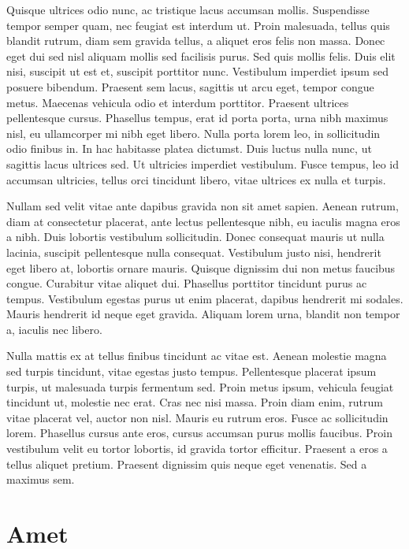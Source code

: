 Quisque ultrices odio nunc, ac tristique lacus accumsan mollis. Suspendisse tempor semper quam, nec feugiat est interdum ut. Proin malesuada, tellus quis blandit rutrum, diam sem gravida tellus, a aliquet eros felis non massa. Donec eget dui sed nisl aliquam mollis sed facilisis purus. Sed quis mollis felis. Duis elit nisi, suscipit ut est et, suscipit porttitor nunc. Vestibulum imperdiet ipsum sed posuere bibendum. Praesent sem lacus, sagittis ut arcu eget, tempor congue metus. Maecenas vehicula odio et interdum porttitor. Praesent ultrices pellentesque cursus. Phasellus tempus, erat id porta porta, urna nibh maximus nisl, eu ullamcorper mi nibh eget libero. Nulla porta lorem leo, in sollicitudin odio finibus in. In hac habitasse platea dictumst. Duis luctus nulla nunc, ut sagittis lacus ultrices sed. Ut ultricies imperdiet vestibulum. Fusce tempus, leo id accumsan ultricies, tellus orci tincidunt libero, vitae ultrices ex nulla et turpis.

Nullam sed velit vitae ante dapibus gravida non sit amet sapien. Aenean rutrum, diam at consectetur placerat, ante lectus pellentesque nibh, eu iaculis magna eros a nibh. Duis lobortis vestibulum sollicitudin. Donec consequat mauris ut nulla lacinia, suscipit pellentesque nulla consequat. Vestibulum justo nisi, hendrerit eget libero at, lobortis ornare mauris. Quisque dignissim dui non metus faucibus congue. Curabitur vitae aliquet dui. Phasellus porttitor tincidunt purus ac tempus. Vestibulum egestas purus ut enim placerat, dapibus hendrerit mi sodales. Mauris hendrerit id neque eget gravida. Aliquam lorem urna, blandit non tempor a, iaculis nec libero.

Nulla mattis ex at tellus finibus tincidunt ac vitae est. Aenean molestie magna sed turpis tincidunt, vitae egestas justo tempus. Pellentesque placerat ipsum turpis, ut malesuada turpis fermentum sed. Proin metus ipsum, vehicula feugiat tincidunt ut, molestie nec erat. Cras nec nisi massa. Proin diam enim, rutrum vitae placerat vel, auctor non nisl. Mauris eu rutrum eros. Fusce ac sollicitudin lorem. Phasellus cursus ante eros, cursus accumsan purus mollis faucibus. Proin vestibulum velit eu tortor lobortis, id gravida tortor efficitur. Praesent a eros a tellus aliquet pretium. Praesent dignissim quis neque eget venenatis. Sed a maximus sem.

\section{Amet}

